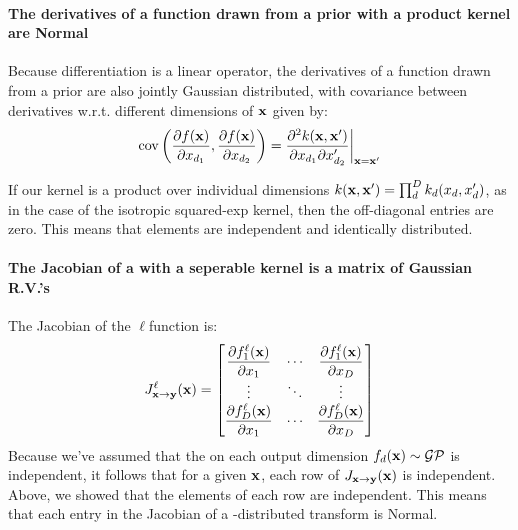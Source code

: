 \documentclass{article}
\newcommand{\Jx}{J_{\vx \rightarrow \vy}}
\newcommand{\Jxx}{J_{\vx \rightarrow \vy}(\vx)}
\newcommand{\Jy}{J_{\vy \rightarrow \vx}}
\begin{document}
\paragraph{The derivatives of a function drawn from a \gp{} prior with a product kernel are \iid Normal}

Because differentiation is a linear operator, the derivatives of a function drawn from a \gp{} prior are also jointly Gaussian distributed, with covariance between derivatives w.r.t. different dimensions of ${\bf{x}}$ given by:
%
\begin{align}
\operatorname{cov} \left( \frac{\partial f({\bf{x}})}{\partial x_{d_1}}, \frac{\partial f({\bf{x}})}{\partial x_{d_2}} \right) 
= \frac{\partial^2 k({\bf{x}}, {\bf{x}}')}{\partial x_{d_1} \partial x_{d_2}'} \bigg|_{{\bf{x}}={\bf{x}}'}
\end{align}
%
\citep{Solak03derivativeobservations}

If our kernel is a product over individual dimensions $k({\bf{x}}, {\bf{x}}') = \prod_d^D k_d(x_d, x_d')$, as in the case of the isotropic squared-exp kernel, then the off-diagonal entries are zero.  This means that elements are independent and identically distributed.

\paragraph{The Jacobian of a \gp{} with a seperable kernel is a matrix of \iid Gaussian R.V.'s}

The Jacobian of the $\ell$\asdf function is:
%
\begin{align}
\Jx^\ell(\vx) =\begin{bmatrix} \dfrac{\partial f^\ell_1 (\vx) }{\partial x_1} & \cdots & \dfrac{\partial f^\ell_1 (\vx)}{\partial x_D} \\ \vdots & \ddots & \vdots \\ \dfrac{\partial f^\ell_D (\vx)}{\partial x_1} & \cdots & \dfrac{\partial f^\ell_D (\vx)}{\partial x_D}  \end{bmatrix}
\end{align}
%
Because we've assumed that the \gp{} on each output dimension $f_d({\bf{x}}) \sim \mathcal{GP}$ is independent, it follows that for a given ${\bf{x}}$, each row of $\Jxx$ is independent.
Above, we showed that the elements of each row are independent.
This means that each entry in the Jacobian of a \gp{}-distributed transform is \iid Normal.

\end{document}
